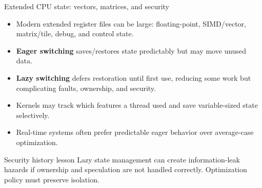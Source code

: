 \documentclass[aspectratio=169,11pt]{beamer}
\newcommand{\concept}[1]{\textcolor{osblue}{\textbf{#1}}}
\begin{document}
\begin{frame}{Extended CPU state: vectors, matrices, and security}
  \begin{itemize}
    \item Modern extended register files can be large: floating-point, SIMD/vector, matrix/tile, debug, and control state.
    \item \concept{Eager switching} saves/restores state predictably but may move unused data.
    \item \concept{Lazy switching} defers restoration until first use, reducing some work but complicating faults, ownership, and security.
    \item Kernels may track which features a thread used and save variable-sized state selectively.
    \item Real-time systems often prefer predictable eager behavior over average-case optimization.
  \end{itemize}
  \begin{alertblock}{Security history lesson}
    Lazy state management can create information-leak hazards if ownership and speculation are not handled correctly. Optimization policy must preserve isolation.
  \end{alertblock}
\end{frame}
\end{document}
